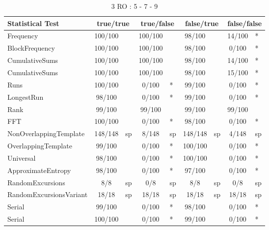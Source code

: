 \begin{table}[h!]
\centering
\caption{3 RO : 5 - 7 - 9}
\label{tab:nist_results}
\begin{tabular}{|l|c|l|c|l|c|l|c|l|}
\hline
\textbf{Statistical Test} & \multicolumn{2}{c|}{\textbf{true/true}} & \multicolumn{2}{c|}{\textbf{true/false}} & \multicolumn{2}{c|}{\textbf{false/true}} & \multicolumn{2}{c|}{\textbf{false/false}} \\ \hline
Frequency               & 100/100 &     & 100/100 &     &  98/100 &     &  14/100 & *   \\ \hline
BlockFrequency          & 100/100 &     & 100/100 &     &  98/100 &     &   0/100 & *   \\ \hline
CumulativeSums          & 100/100 &     & 100/100 &     &  98/100 &     &  14/100 & *   \\ \hline
CumulativeSums          & 100/100 &     & 100/100 &     &  98/100 &     &  15/100 & *   \\ \hline
Runs                    & 100/100 &     &   0/100 & *   &  99/100 &     &   0/100 & *   \\ \hline
LongestRun              &  98/100 &     &   0/100 & *   &  99/100 &     &   0/100 & *   \\ \hline
Rank                    &  99/100 &     &  99/100 &     &  99/100 &     &  99/100 &     \\ \hline
FFT                     & 100/100 &     &   0/100 & *   &  98/100 &     &   0/100 & *   \\ \hline
NonOverlappingTemplate  & 148/148 & sp  &   8/148 & sp  & 148/148 & sp  &   4/148 & sp  \\ \hline
OverlappingTemplate     &  99/100 &     &   0/100 & *   & 100/100 &     &   0/100 & *   \\ \hline
Universal               &  98/100 &     &   0/100 & *   & 100/100 &     &   0/100 & *   \\ \hline
ApproximateEntropy      &  98/100 &     &   0/100 & *   &  97/100 &     &   0/100 & *   \\ \hline
RandomExcursions        &     8/8 & sp  &     0/8 & sp  &     8/8 & sp  &     0/8 & sp  \\ \hline
RandomExcursionsVariant &   18/18 & sp  &   18/18 & sp  &   18/18 & sp  &   18/18 & sp  \\ \hline
Serial                  &  99/100 &     &   0/100 & *   &  98/100 &     &   0/100 & *   \\ \hline
Serial                  & 100/100 &     &   0/100 & *   &  99/100 &     &   0/100 & *   \\ \hline

\end{tabular}
\end{table}
